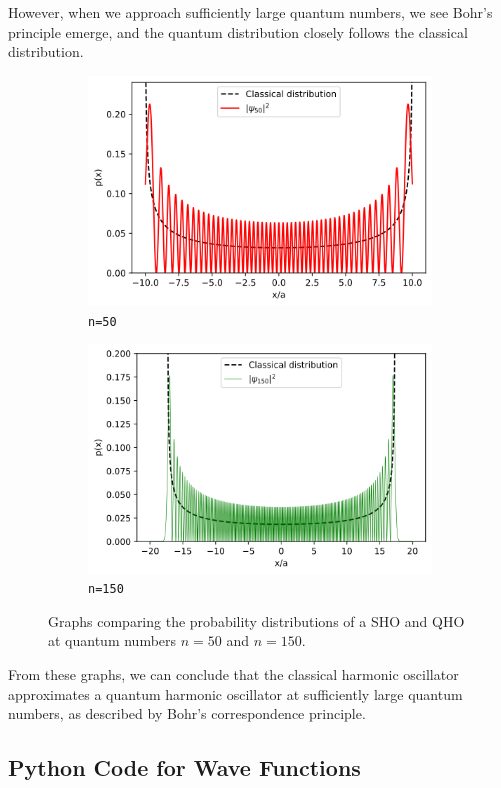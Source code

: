 \documentclass[a4paper]{article}
\begin{document}
However, when we approach sufficiently large quantum numbers, we see Bohr's principle emerge, and the quantum distribution closely follows the classical distribution.
\begin{figure}[h!]
  \centering
  \begin{subfigure}{.5\textwidth}
    \centering
    \centerline{\includegraphics[scale=0.55]{n50.png}}
    \caption{{\lstinline$n=50$}}
  \end{subfigure}%
  \begin{subfigure}{.5\textwidth}
    \centering
    \centerline{\includegraphics[scale=0.55]{n150.png}}
    \caption{{\lstinline$n=150$}}
  \end{subfigure}
  \label{fig:gratings}
  \caption{Graphs comparing the probability distributions of a SHO and QHO at quantum numbers $n=50$ and $n=150$.}
  \end{figure}
\newpage
From these graphs, we can conclude that the classical harmonic oscillator approximates a quantum harmonic oscillator at sufficiently large quantum numbers, as described by Bohr's correspondence principle.
\newpage

\begin{appendix}
\section{Python Code for Wave Functions}\label{sec:python}

\newpage



\end{appendix}
\end{document}
